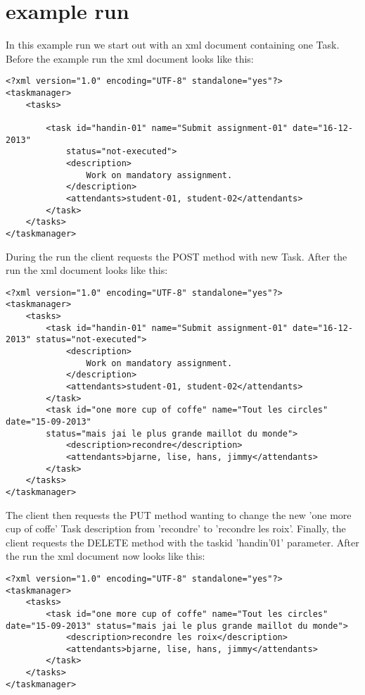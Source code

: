 \section{example run}
\label{tcp_example}

In this example run we start out with an xml document containing one Task. Before the example run the xml document looks like this:

\begin{lstlisting}[caption=xml before run]
<?xml version="1.0" encoding="UTF-8" standalone="yes"?>
<taskmanager>
	<tasks>
		
		<task id="handin-01" name="Submit assignment-01" date="16-12-2013"
			status="not-executed">
			<description>
				Work on mandatory assignment.
			</description>
			<attendants>student-01, student-02</attendants>
		</task>	
	</tasks>
</taskmanager>

\end{lstlisting}

During the run the client requests the POST method with new Task. After the run the xml document looks like this:

\begin{lstlisting}[caption=xml after POST]
<?xml version="1.0" encoding="UTF-8" standalone="yes"?>
<taskmanager>
	<tasks>
		<task id="handin-01" name="Submit assignment-01" date="16-12-2013" status="not-executed">
			<description>
				Work on mandatory assignment.
			</description>
			<attendants>student-01, student-02</attendants>
		</task>
		<task id="one more cup of coffe" name="Tout les circles" date="15-09-2013" 
		status="mais jai le plus grande maillot du monde">
			<description>recondre</description>
			<attendants>bjarne, lise, hans, jimmy</attendants>
		</task>
	</tasks>
</taskmanager>
\end{lstlisting}

The client then requests the PUT method wanting to change the new 'one more cup of coffe' Task description from 'recondre' to 'recondre les roix'. Finally, the client requests the DELETE method with the taskid 'handin'01' parameter. After the run the xml document now looks like this:

\begin{lstlisting}[caption=xml after PUT]
<?xml version="1.0" encoding="UTF-8" standalone="yes"?>
<taskmanager>
	<tasks>
		<task id="one more cup of coffe" name="Tout les circles" date="15-09-2013" status="mais jai le plus grande maillot du monde">
			<description>recondre les roix</description>
			<attendants>bjarne, lise, hans, jimmy</attendants>
		</task>
	</tasks>
</taskmanager>
\end{lstlisting}

